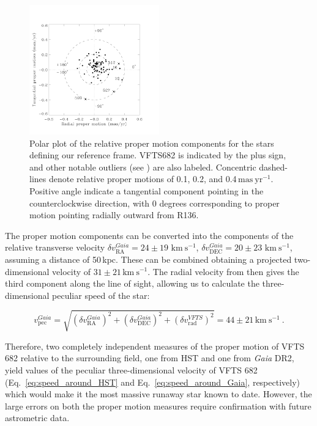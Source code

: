 \documentclass[a4paper,fleqn,usenatbib]{mnras}
\newcommand{\kms}{{\,\mathrm{km\ s^{-1}}}}
\DeclareRobustCommand{\Eqref}[1]{Eq.~\ref{#1}}
\begin{document}
\begin{figure}%
  \centering
  \includegraphics[width=0.5\textwidth]{figures/figure_polar_682-1.pdf}
  \caption{Polar plot of the relative proper motion components for the stars
    defining our reference frame. VFTS682 is indicated by the plus sign, and
    other notable outliers (see \citet{lennon:18}) are also labeled. Concentric dashed-lines denote relative proper motions of
    0.1, 0.2, and 0.4$\,\mathrm{mas\ yr^{-1}}$. Positive angle
    indicate a tangential component pointing in the counterclockwise
    direction, with 0 degrees corresponding to proper motion pointing
    radially outward from R136.
  }
  \label{fig:pm_polar}
\end{figure}



The proper motion components can be converted into
the components of the relative transverse velocity $\delta v_\mathrm{RA}^{Gaia}=24\pm19\,\kms$,
$\delta v_\mathrm{DEC}^{Gaia}=20\pm23\,\kms$, assuming a distance of
50\,kpc. These can be combined obtaining a projected two-dimensional
velocity of $31\pm21\kms$. %
The radial velocity from
\cite{bestenlehner:11} then gives the third component along
the line of sight, allowing us to calculate the three-dimensional
peculiar speed of the star:

\begin{equation}
  \label{eq:speed_around_Gaia}
  v_\mathrm{pec}^{Gaia} = \sqrt{\left(\delta v_\mathrm{RA}^{Gaia}\right)^2
    +\left(\delta v_\mathrm{DEC}^{Gaia}\right)^2+\left(\delta
      v_\mathrm{rad}^{VFTS}\right)^2} = 44 \pm 21
  \kms \ .
\end{equation}

Therefore, two completely independent measures of the proper motion of
VFTS 682 relative to the surrounding field, one from HST and one from
\emph{Gaia} DR2, yield values of the peculiar three-dimensional
velocity of VFTS 682 (\Eqref{eq:speed_around_HST} and
\Eqref{eq:speed_around_Gaia}, respectively) which would make it the most massive runaway star
known to date. However, the large errors on both the proper motion measures
require confirmation with future astrometric data. 
\end{document}
